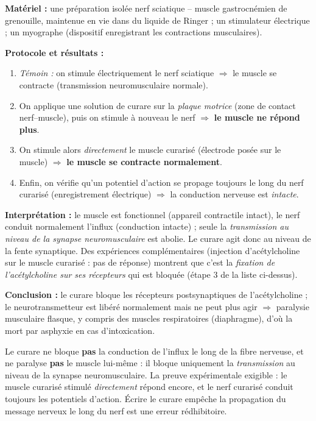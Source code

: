 \documentclass[11pt]{article}
\newcommand{\cle}[1]{{\popxbold\color{popdark}#1}}
\begin{document}
\begin{experience}
\textbf{Matériel :} une préparation isolée \og nerf sciatique -- muscle gastrocnémien \fg{} de grenouille, maintenue en vie dans du liquide de Ringer ; un stimulateur électrique ; un myographe (dispositif enregistrant les contractions musculaires).

\textbf{Protocole et résultats :}
\begin{enumerate}
\item \emph{Témoin :} on stimule électriquement le nerf sciatique $\Rightarrow$ le muscle se contracte (transmission neuromusculaire normale).
\item On applique une solution de curare sur la \emph{plaque motrice} (zone de contact nerf--muscle), puis on stimule à nouveau le nerf $\Rightarrow$ \textbf{le muscle ne répond plus}.
\item On stimule alors \emph{directement} le muscle curarisé (électrode posée sur le muscle) $\Rightarrow$ \textbf{le muscle se contracte normalement}.
\item Enfin, on vérifie qu'un potentiel d'action se propage toujours le long du nerf curarisé (enregistrement électrique) $\Rightarrow$ la conduction nerveuse est \emph{intacte}.
\end{enumerate}

\textbf{Interprétation :} le muscle est fonctionnel (appareil contractile intact), le nerf conduit normalement l'influx (conduction intacte) ; seule la \emph{transmission au niveau de la synapse neuromusculaire} est abolie. Le curare agit donc au niveau de la fente synaptique. Des expériences complémentaires (injection d'acétylcholine sur le muscle curarisé : pas de réponse) montrent que c'est la \emph{fixation de l'acétylcholine sur ses récepteurs} qui est bloquée (étape 3 de la liste ci-dessus).

\textbf{Conclusion :} le curare bloque les récepteurs postsynaptiques de l'acétylcholine ; le neurotransmetteur est libéré normalement mais ne peut plus agir $\Rightarrow$ \cle{paralysie musculaire} flasque, y compris des muscles respiratoires (diaphragme), d'où la mort par asphyxie en cas d'intoxication.
\end{experience}

\begin{attention}
Le curare ne bloque \textbf{pas} la conduction de l'influx le long de la fibre nerveuse, et ne paralyse \textbf{pas} le muscle lui-même : il bloque uniquement la \emph{transmission} au niveau de la synapse neuromusculaire. La preuve expérimentale exigible : le muscle curarisé stimulé \emph{directement} répond encore, et le nerf curarisé conduit toujours les potentiels d'action. Écrire \og le curare empêche la propagation du message nerveux le long du nerf \fg{} est une erreur rédhibitoire.
\end{attention}
\end{document}
